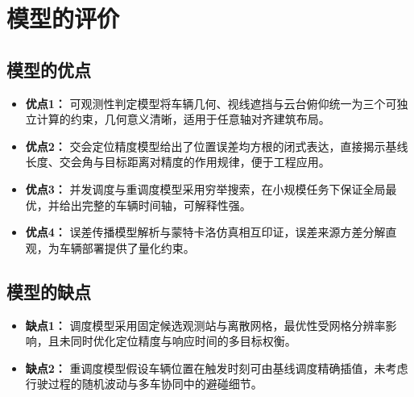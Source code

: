 
\section{模型的评价}

\subsection{模型的优点}
\begin{itemize}[itemindent=2em]
\item \textbf{优点1：} 可观测性判定模型将车辆几何、视线遮挡与云台俯仰统一为三个可独立计算的约束，几何意义清晰，适用于任意轴对齐建筑布局。
\item \textbf{优点2：} 交会定位精度模型给出了位置误差均方根的闭式表达，直接揭示基线长度、交会角与目标距离对精度的作用规律，便于工程应用。
\item \textbf{优点3：} 并发调度与重调度模型采用穷举搜索，在小规模任务下保证全局最优，并给出完整的车辆时间轴，可解释性强。
\item \textbf{优点4：} 误差传播模型解析与蒙特卡洛仿真相互印证，误差来源方差分解直观，为车辆部署提供了量化约束。
\end{itemize}

\subsection{模型的缺点}
\begin{itemize}[itemindent=2em]
\item \textbf{缺点1：} 调度模型采用固定候选观测站与离散网格，最优性受网格分辨率影响，且未同时优化定位精度与响应时间的多目标权衡。
\item \textbf{缺点2：} 重调度模型假设车辆位置在触发时刻可由基线调度精确插值，未考虑行驶过程的随机波动与多车协同中的避碰细节。
\end{itemize}
